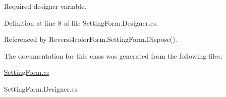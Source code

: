 Required designer variable. 



Definition at line 8 of file Setting\+Form.\+Designer.\+cs.



Referenced by Reversi4color\+Form.\+Setting\+Form.\+Dispose().



The documentation for this class was generated from the following files\+:\begin{DoxyCompactItemize}
\item 
\hyperlink{_setting_form_8cs}{Setting\+Form.\+cs}\item 
Setting\+Form.\+Designer.\+cs\end{DoxyCompactItemize}
